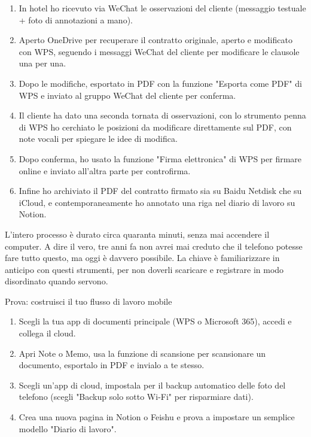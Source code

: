 \begin{enumerate}
  \item In hotel ho ricevuto via WeChat le osservazioni del cliente (messaggio testuale + foto di annotazioni a mano).
  \item Aperto OneDrive per recuperare il contratto originale, aperto e modificato con WPS, seguendo i messaggi WeChat del cliente per modificare le clausole una per una.
  \item Dopo le modifiche, esportato in PDF con la funzione "Esporta come PDF" di WPS e inviato al gruppo WeChat del cliente per conferma.
  \item Il cliente ha dato una seconda tornata di osservazioni, con lo strumento penna di WPS ho cerchiato le posizioni da modificare direttamente sul PDF, con note vocali per spiegare le idee di modifica.
  \item Dopo conferma, ho usato la funzione "Firma elettronica" di WPS per firmare online e inviato all'altra parte per controfirma.
  \item Infine ho archiviato il PDF del contratto firmato sia su Baidu Netdisk che su iCloud, e contemporaneamente ho annotato una riga nel diario di lavoro su Notion.
\end{enumerate}

L'intero processo è durato circa quaranta minuti, senza mai accendere il computer. A dire il vero, tre anni fa non avrei mai creduto che il telefono potesse fare tutto questo, ma oggi è davvero possibile. La chiave è familiarizzare in anticipo con questi strumenti, per non doverli scaricare e registrare in modo disordinato quando servono.

\begin{tcbpractice}{Prova: costruisci il tuo flusso di lavoro mobile}
\begin{enumerate}
  \item Scegli la tua app di documenti principale (WPS o Microsoft 365), accedi e collega il cloud.
  \item Apri Note o Memo, usa la funzione di scansione per scansionare un documento, esportalo in PDF e invialo a te stesso.
  \item Scegli un'app di cloud, impostala per il backup automatico delle foto del telefono (scegli "Backup solo sotto Wi-Fi" per risparmiare dati).
  \item Crea una nuova pagina in Notion o Feishu e prova a impostare un semplice modello "Diario di lavoro".
\end{enumerate}

\end{tcbpractice}
